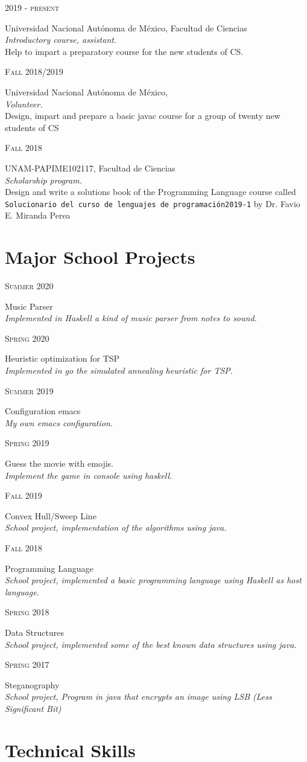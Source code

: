 \documentclass{article}
\newcommand{\UNAM}{Universidad Nacional Aut\'onoma de M\'exico, }
\newcommand{\FC}{Facultad de Ciencias}
\newcommand{\entry}[4]{  
  \begin{minipage}[t]{.15\textwidth}
    \hfill \textsc{#1}\\
  \end{minipage}
  \hfill\vline\hfill
  \begin{minipage}[t]{.80\textwidth}
    #2\\
    \textit{#3}\\
    \footnotesize{#4}
  \end{minipage}
}
\newcommand{\SchoolProjects}[3]{
  \begin{minipage}[t]{.15\textwidth}
    \hfill \textsc{#1}\\
  \end{minipage}
  \hfill\vline\hfill
  \begin{minipage}[t]{.80\textwidth}
    #2\\
    \textit{#3}
  \end{minipage}
}
\begin{document}
\entry{2019 - present}
      {\UNAM\FC}
      {Introductory course, assistant.}
      {Help to impart a preparatory course for the new students of CS.}

\entry{Fall 2018/2019}
      {\UNAM}
      {Volunteer.}
      {Design, impart and prepare a basic javac course for a group
        of twenty new students of CS}
      
\entry{Fall 2018}
      {UNAM-PAPIME102117, \FC}
      {Scholarship program.}
      {Design and write a solutions book of the Programming Language course
        called \texttt{Solucionario del curso de lenguajes de programación2019-1}
        by Dr. Favio E. Miranda Perea}


\section{Major School Projects}
\SchoolProjects{Summer 2020}
               {Music Parser}
               {Implemented in Haskell a kind of music parser from notes to sound.}
      
\SchoolProjects{Spring 2020}
               {Heuristic optimization for TSP}
               {Implemented in go the simulated annealing heuristic for TSP.}
      
\SchoolProjects{Summer 2019}
               {Configuration emacs}
               {My own emacs configuration.}

\SchoolProjects{Spring 2019}
               {Guess the movie with emojis.}
               {Implement the game in console using haskell.}
               
\SchoolProjects{Fall 2019}      
               {Convex Hull/Sweep Line}
               {School project, implementation of the algorithms using java.}
               
\SchoolProjects{Fall 2018}      
               {Programming Language}
               {School project, implemented a basic programming language using
                 Haskell as host language.}
               
\SchoolProjects{Spring 2018}      
               {Data Structures}
               {School project, implemented some of the best known data
                 structures using java.}
               
\SchoolProjects{Spring 2017}
               {Steganography}
               {School project, Program in java that encrypts an image using LSB
                 (Less Significant Bit)}

\section{Technical Skills}
               
\end{document}

